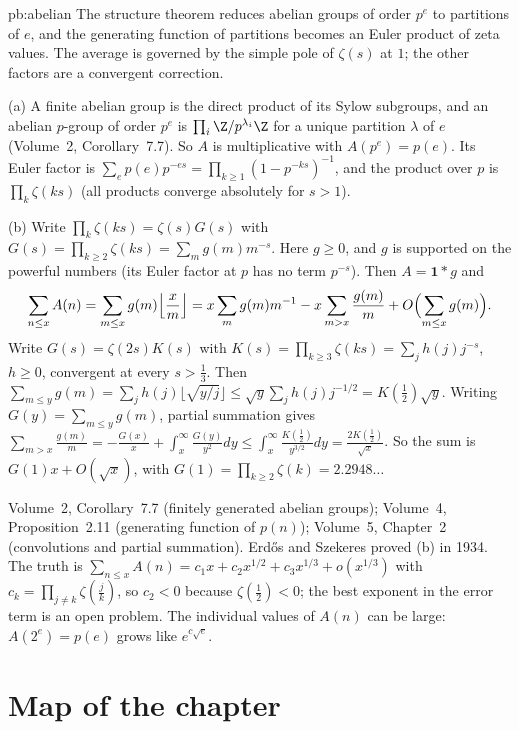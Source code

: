 \begin{solution}{pb:abelian}
\idea The structure theorem reduces abelian groups of order $p^e$ to partitions of $e$, and the generating function of partitions
becomes an Euler product of zeta values. The average is governed by the simple pole of $\zeta(s)$ at $1$; the other factors are a
convergent correction.

\writeup (a) A finite abelian group is the direct product of its Sylow subgroups, and an abelian $p$-group of order $p^e$ is
$\prod_i\Z/p^{\lambda_i}\Z$ for a unique partition $\lambda$ of $e$ (Volume~2, Corollary~7.7). So $A$ is multiplicative with $A(p^e)=p(e)$. Its
Euler factor is $\sum_ep(e)p^{-es}=\prod_{k\ge1}(1-p^{-ks})^{-1}$, and the product over $p$ is $\prod_k\zeta(ks)$ (all products converge
absolutely for $s>1$).

(b) Write $\prod_k\zeta(ks)=\zeta(s)G(s)$ with $G(s)=\prod_{k\ge2}\zeta(ks)=\sum_mg(m)m^{-s}$. Here $g\ge0$, and $g$ is supported on the
powerful numbers (its Euler factor at $p$ has no term $p^{-s}$). Then $A=\mathbf1*g$ and
\[
\sum_{n\le x}A(n)=\sum_{m\le x}g(m)\Bigl\lfloor\frac xm\Bigr\rfloor=x\sum_mg(m)m^{-1}-x\sum_{m>x}\frac{g(m)}m+O\Bigl(\sum_{m\le x}g(m)\Bigr).
\]
Write $G(s)=\zeta(2s)K(s)$ with $K(s)=\prod_{k\ge3}\zeta(ks)=\sum_jh(j)j^{-s}$, $h\ge0$, convergent at every $s>\frac13$. Then
$\sum_{m\le y}g(m)=\sum_jh(j)\lfloor\sqrt{y/j}\rfloor\le\sqrt y\sum_jh(j)j^{-1/2}=K(\tfrac12)\sqrt y$. Writing $G(y)=\sum_{m\le y}g(m)$, partial summation gives
$\sum_{m>x}\frac{g(m)}m=-\frac{G(x)}x+\int_x^\infty\frac{G(y)}{y^2}dy\le\int_x^\infty\frac{K(\frac12)}{y^{3/2}}dy=\frac{2K(\frac12)}{\sqrt x}$. So the sum is $G(1)x+O(\sqrt x)$, with
$G(1)=\prod_{k\ge2}\zeta(k)=2.2948\ldots$

\tools Volume~2, Corollary~7.7 (finitely generated abelian groups); Volume~4, Proposition~2.11 (generating function of $p(n)$);
Volume~5, Chapter~2 (convolutions and partial summation).
\leads Erdős and Szekeres proved (b) in 1934. The truth is $\sum_{n\le x}A(n)=c_1x+c_2x^{1/2}+c_3x^{1/3}+o(x^{1/3})$ with $c_k=\prod_{j\ne k}\zeta(\frac jk)$, so
$c_2<0$ because $\zeta(\frac12)<0$; the best exponent in the error term is an open problem. The individual values of $A(n)$ can be large: $A(2^{e})=p(e)$ grows like
$e^{c\sqrt e}$.
\end{solution}

\section*{Map of the chapter}

